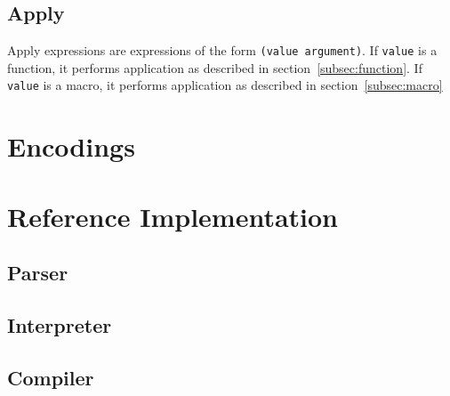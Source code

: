 \documentclass{article}
\begin{document}
\begin{multicols}{2}
        \subsection{Apply}\label{subsec:apply}

        \begin{minipage}{\columnwidth}
            Apply expressions are expressions of the form \lstinline$(value argument)$.
            If \lstinline$value$ is a function, it performs application as described in section~\ref{subsec:function}.
            If \lstinline$value$ is a macro, it performs application as described in section~\ref{subsec:macro}
        \end{minipage}
    \end{multicols}
    \newpage

    \section{Encodings}\label{sec:encodings}

    \begin{multicols*}{2}
        
    \end{multicols*}
    \newpage

    \section{Reference Implementation}\label{sec:implementation}

    \subsection{Parser}\label{subsec:parser}

    

    \subsection{Interpreter}\label{subsec:interpreter}

    

    \subsection{Compiler}\label{subsec:compiler}

    
\end{document}
